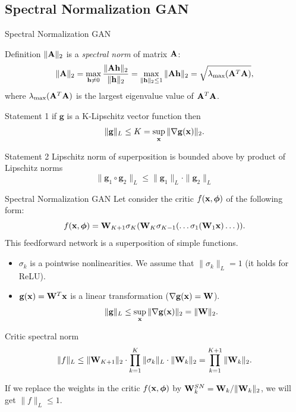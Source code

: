 \subsection{Spectral Normalization GAN}
\begin{frame}{Spectral Normalization GAN}
	\begin{block}{Definition}
		$\| \mathbf{A} \|_2$ is a \textit{spectral norm} of matrix $\mathbf{A}$:
		\[
			\| \mathbf{A} \|_2 = \max_{\mathbf{h} \neq 0} \frac{\|\mathbf{A} \mathbf{h}\|_2}{\|\mathbf{h}\|_2} = \max_{\|\mathbf{h}\|_2 \leq 1} \| \mathbf{A} \mathbf{h} \|_2 = \sqrt{\lambda_{\text{max}}(\mathbf{A}^T \mathbf{A})},
		\]
		where $\lambda_{\text{max}}(\mathbf{A}^T \mathbf{A})$ is the largest eigenvalue value of $\mathbf{A}^T \mathbf{A}$.
	\end{block}
	\begin{block}{Statement 1}
		if $\mathbf{g}$ is a K-Lipschitz vector function then 
		\[
			\| \mathbf{g} \|_L \leq K = \sup_{\mathbf{x}} \| \nabla \mathbf{g}(\mathbf{x}) \|_2.
		\]
		\vspace{-0.7cm}
	\end{block}
	\begin{block}{Statement 2}
		Lipschitz norm of superposition is bounded above by product of Lipschitz norms
		\vspace{-0.2cm}
		\[
			\| \mathbf{g}_1 \circ \mathbf{g}_2 \|_L \leq \| \mathbf{g}_1 \|_L \cdot \| \mathbf{g}_2\|_L
		\]
	\end{block}
\end{frame}
\begin{frame}{Spectral Normalization GAN}
	Let consider the critic $f(\mathbf{x}, \boldsymbol{\phi})$ of the following form:
	\[
		f(\mathbf{x}, \boldsymbol{\phi}) = \mathbf{W}_{K+1} \sigma_K (\mathbf{W}_K \sigma_{K-1}(\dots \sigma_1(\mathbf{W}_1 \mathbf{x}) \dots)).
	\]
	This feedforward network is a superposition of simple functions.
	\begin{itemize}
		\item $\sigma_k$ is a pointwise nonlinearities. We assume that $\| \sigma_k \|_L = 1$ (it holds for ReLU).
		\item $\mathbf{g}(\mathbf{x}) = \mathbf{W}^T \mathbf{x}$ is a linear transformation ($\nabla \mathbf{g}(\mathbf{x}) = \mathbf{W}$).
		\[
			\| \mathbf{g} \|_L \leq \sup_{\mathbf{x}} \| \nabla \mathbf{g}(\mathbf{x})\|_2 = \| \mathbf{W} \|_2.
		\]
	\end{itemize}
	\vspace{-0.4cm}
	\begin{block}{Critic spectral norm}
		\vspace{-0.4cm}
		\[
			\| f \|_L \leq \| \mathbf{W}_{K+1}\|_2 \cdot \prod_{k=1}^K  \| \sigma_k \|_L \cdot \| \mathbf{W}_k \|_2 = \prod_{k=1}^{K+1} \|\mathbf{W}_k\|_2.
		\]
		\vspace{-0.2cm}
	\end{block}
	If we replace the weights in the critic $f(\mathbf{x}, \boldsymbol{\phi})$ by $\mathbf{W}^{SN}_k = \mathbf{W}_k / \|\mathbf{W}_k\|_2$, we will get $\| f\|_L \leq 1.$ \\
	
\end{frame}
